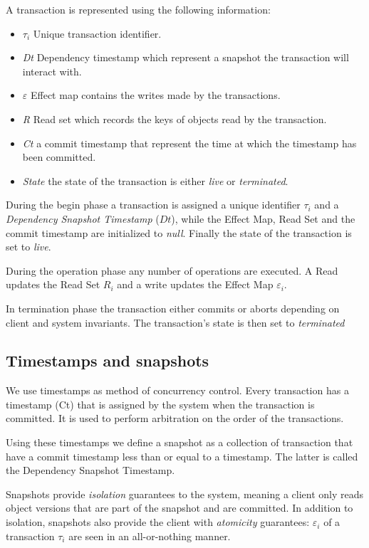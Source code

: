 \documentclass[systeme,french,english]{compas2022}
\begin{document}
A transaction is represented using the following information:
\begin{itemize}
\item \emph{$\tau_i$} Unique transaction identifier.
\item \emph{Dt} Dependency timestamp which represent a snapshot the transaction will interact with.
\item \emph{$\varepsilon$} Effect map contains the writes made by the transactions.
\item \emph{R} Read set which records the keys of objects read by the transaction.
\item \emph{Ct} a commit timestamp that represent the time at which the timestamp has been committed.
\item \emph{State} the state of the transaction is either \emph{live} or \emph{terminated}.\\
\end{itemize}

During the begin phase a transaction is assigned a unique identifier $\tau_i$ and a \emph{Dependency Snapshot Timestamp} ($Dt$), while the Effect Map, Read Set and the commit timestamp are initialized to \emph{null}. Finally the state of the transaction is set to \emph{live}.

During the operation phase any number of operations are executed.
A Read updates the Read Set $R_i$ and a write updates the Effect Map $\varepsilon_i$.

In termination phase the transaction either commits or aborts depending on client and system invariants. 
The transaction's state is then set to \emph{terminated}

\subsection{Timestamps and snapshots}

We use timestamps as method of concurrency control.
Every transaction has a timestamp (Ct) that is assigned by the system when the transaction is committed.
It is used to perform arbitration on the order of the transactions.

Using these timestamps we define a snapshot as a collection of transaction that have a commit timestamp less than or equal to a timestamp.
The latter is called the Dependency Snapshot Timestamp.

Snapshots provide \emph{isolation} guarantees to the system, meaning a client only reads object versions that are part of the snapshot and are committed. 
In addition to isolation, snapshots also provide the client with \emph{atomicity} guarantees: $\varepsilon_i$ of a transaction $\tau_i$ are seen in an all-or-nothing manner.
\end{document}
